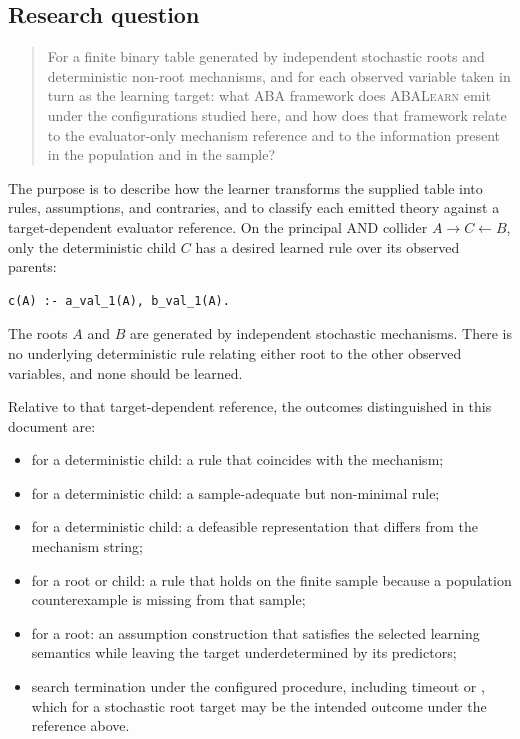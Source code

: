 \documentclass[11pt]{article}
\DeclareRobustCommand{\code}[1]{\texttt{\detokenize{#1}}}
\newcommand{\ABALearn}{\textsc{ABALearn}}
\begin{document}
\subsection{Research question}

\begin{quote}
For a finite binary table generated by independent stochastic roots and
deterministic non-root mechanisms, and for each observed variable taken in
turn as the learning target: what ABA framework does \ABALearn{} emit under
the configurations studied here, and how does that framework relate to the
evaluator-only mechanism reference and to the information present in the
population and in the sample?
\end{quote}

The purpose is to describe how the learner transforms the supplied table into
rules, assumptions, and contraries, and to classify each emitted theory
against a target-dependent evaluator reference. On the principal AND
collider \(A\rightarrow C\leftarrow B\), only the deterministic child \(C\)
has a desired learned rule over its observed parents:

\begin{lstlisting}
c(A) :- a_val_1(A), b_val_1(A).
\end{lstlisting}

The roots \(A\) and \(B\) are generated by independent stochastic mechanisms.
There is no underlying deterministic rule relating either root to the other
observed variables, and none should be learned.

Relative to that target-dependent reference, the outcomes distinguished in
this document are:

\begin{itemize}
  \item for a deterministic child: a rule that coincides with the mechanism;
  \item for a deterministic child: a sample-adequate but non-minimal rule;
  \item for a deterministic child: a defeasible representation that differs
  from the mechanism string;
  \item for a root or child: a rule that holds on the finite sample because a
  population counterexample is missing from that sample;
  \item for a root: an assumption construction that satisfies the selected
  learning semantics while leaving the target underdetermined by its
  predictors;
  \item search termination under the configured procedure, including timeout
  or \code{completed_no_solution}, which for a stochastic root target may be
  the intended outcome under the reference above.
\end{itemize}
\end{document}
